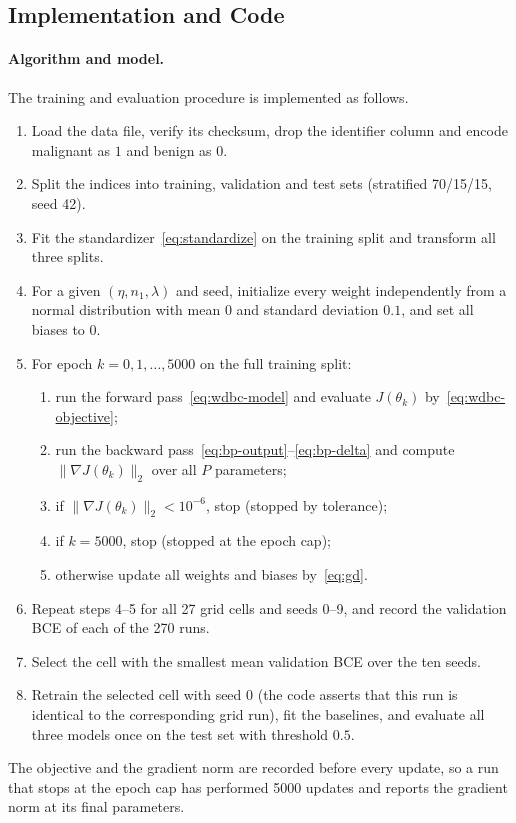 \subsection{Implementation and Code}
\label{sec:impl}

\paragraph{Algorithm and model.}
The training and evaluation procedure is implemented as follows.
\begin{enumerate}
  \item Load the data file, verify its checksum, drop the identifier column and encode malignant as $1$ and benign as $0$.
  \item Split the indices into training, validation and test sets (stratified 70/15/15, seed 42).
  \item Fit the standardizer~\eqref{eq:standardize} on the training split and transform all three splits.
  \item For a given $(\eta,n_1,\lambda)$ and seed, initialize every weight independently from a normal distribution with mean $0$ and standard deviation $0.1$, and set all biases to $0$.
  \item For epoch $k=0,1,\dots,5000$ on the full training split:
  \begin{enumerate}
    \item run the forward pass~\eqref{eq:wdbc-model} and evaluate $J(\theta_k)$ by~\eqref{eq:wdbc-objective};
    \item run the backward pass~\eqref{eq:bp-output}--\eqref{eq:bp-delta} and compute $\lVert\nabla J(\theta_k)\rVert_2$ over all $P$ parameters;
    \item if $\lVert\nabla J(\theta_k)\rVert_2<10^{-6}$, stop (stopped by tolerance);
    \item if $k=5000$, stop (stopped at the epoch cap);
    \item otherwise update all weights and biases by~\eqref{eq:gd}.
  \end{enumerate}
  \item Repeat steps 4--5 for all 27 grid cells and seeds 0--9, and record the validation BCE of each of the 270 runs.
  \item Select the cell with the smallest mean validation BCE over the ten seeds.
  \item Retrain the selected cell with seed 0 (the code asserts that this run is identical to the corresponding grid run), fit the baselines, and evaluate all three models once on the test set with threshold $0.5$.
\end{enumerate}
The objective and the gradient norm are recorded before every update, so a run that stops at the epoch cap has performed 5000 updates and reports the gradient norm at its final parameters.

